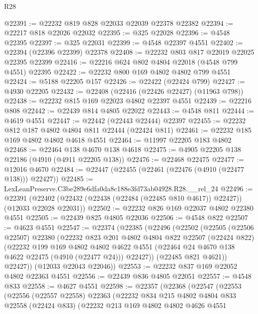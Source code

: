 \begin{lexlean}{R28}
\begin{coremodule}
@22391 := @22232 @819 @828 @22033 @22039 @22378 @22382
@22394 := @22217 @818 @22026 @22032
@22395 := @325 @22028
@22396 := @4548 @22395
@22397 := @325 @22031
@22399 := @4548 @22397 @4551
@22402 := @22394 (@22396 @22399) @22378
@22408 := @22232 @803 @817 @22019 @22025 @22395 @22399
@22416 := @22216 @624 @802 @4804 @22018 (@4548 @799 @4551) @22395
@22422 := @22232 @800 @169 @4802 @4802 @799 @4551
@22424 := @5188 @22205 @157
@22426 := @22422 (@22424 @799)
@22427 := @4930 @22205
@22432 := @22408 (@22416 (@22426 @22427) (@11963 @798))
@22438 := @22232 @815 @169 @22023 @4802 @22397 @4551
@22439 := @22216 @808
@22442 := @22439 @814 @4805 @22022
@22443 := @4548 @811
@22444 := @4619 @4551
@22447 := @22442 (@22443 @22444) @22397
@22455 := @22232 @812 @187 @4802 @4804 @811 @22444 (@22424 @811)
@22461 := @22232 @185 @169 @4802 @4802 @4618 @4551
@22464 := @11997 @22205 @183 @4802
@22468 := @22464 @138 @4670 @138 @4618
@22475 := @4905 @22205 @138 @22186 (@4910 (@4911 @22205 @138))
@22476 := @22468 @22475
@22477 := @12016 @4670
@22484 := @22447 (@22455 (@22461 (@22476 (@4910 (@22477 @138))) @22427))
@22485 := LexLeanPreserve.C3be289e6dfa0da8c188e3fd73ab04928.R28.__rel_24
@22496 := @22391
    (@22402 (@22432 (@22438 (@22484 (@22485 @810 @4617)) @22427)) (@12033 @22028 @22031))
@22502 := @22232 @826 @169 @22037 @4802 @22380 @4551
@22505 := @22439 @825 @4805 @22036
@22506 := @4548 @822
@22507 := @4623 @4551
@22547 := @22374
    (@22385
      (@22496
        (@22502
          (@22505
            (@22506 @22507)
            @22380
            (@22232
              @823
              @201
              @4802
              @4804
              @822
              @22507
              (@22424 @822)
              (@22232
                @199
                @169
                @4802
                @4802
                @4622
                @4551
                (@22464 @24 @4670 @138 @4622 @22475 (@4910 (@22477 @24)))
                @22427))
            (@22485 @821 @4621))
          @22427))
      (@12033 @22043 @22046))
@22553 := @22232 @837 @169 @22052 @4802 @22363 @4551
@22556 := @22439 @836 @4805 @22051
@22557 := @4548 @833
@22558 := @4627 @4551
@22598 := @22357
    (@22368
      (@22547
        (@22553
          (@22556
            (@22557 @22558)
            @22363
            (@22232
              @834
              @215
              @4802
              @4804
              @833
              @22558
              (@22424 @833)
              (@22232
                @213
                @169
                @4802
                @4802
                @4626
                @4551

\end{coremodule}
\end{lexlean}
